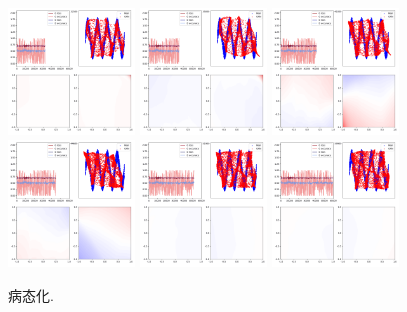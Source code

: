 \documentclass[lang=cn,11pt]{elegantpaper}
\begin{document}
\begin{figure}[htbp]
  \centering
  \includegraphics[width=0.3\textwidth]{sin_4_1}
  \includegraphics[width=0.3\textwidth]{sin_4_2}
  \includegraphics[width=0.3\textwidth]{sin_4_3}\\
  \includegraphics[width=0.3\textwidth]{sin_4_4}
  \includegraphics[width=0.3\textwidth]{sin_4_5}
  \includegraphics[width=0.3\textwidth]{sin_4_6}
  \caption{病态化. \label{fig:f2}}
\end{figure}
\end{document}
